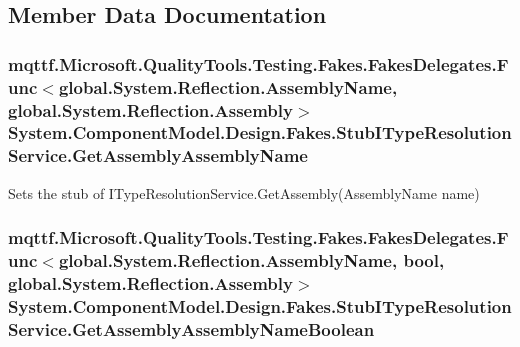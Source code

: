 \subsection{Member Data Documentation}
\hypertarget{class_system_1_1_component_model_1_1_design_1_1_fakes_1_1_stub_i_type_resolution_service_af9f13884b7ffda6eea45ee12b26d40ce}{
\subsubsection[{Get\-Assembly\-Assembly\-Name}]{\setlength{\rightskip}{0pt plus 5cm}mqttf.\-Microsoft.\-Quality\-Tools.\-Testing.\-Fakes.\-Fakes\-Delegates.\-Func$<$global.\-System.\-Reflection.\-Assembly\-Name, global.\-System.\-Reflection.\-Assembly$>$ System.\-Component\-Model.\-Design.\-Fakes.\-Stub\-I\-Type\-Resolution\-Service.\-Get\-Assembly\-Assembly\-Name}}\label{class_system_1_1_component_model_1_1_design_1_1_fakes_1_1_stub_i_type_resolution_service_af9f13884b7ffda6eea45ee12b26d40ce}


Sets the stub of I\-Type\-Resolution\-Service.\-Get\-Assembly(\-Assembly\-Name name)

\hypertarget{class_system_1_1_component_model_1_1_design_1_1_fakes_1_1_stub_i_type_resolution_service_ab5c3d30a68e45b39324047c217536da9}{
\subsubsection[{Get\-Assembly\-Assembly\-Name\-Boolean}]{\setlength{\rightskip}{0pt plus 5cm}mqttf.\-Microsoft.\-Quality\-Tools.\-Testing.\-Fakes.\-Fakes\-Delegates.\-Func$<$global.\-System.\-Reflection.\-Assembly\-Name, bool, global.\-System.\-Reflection.\-Assembly$>$ System.\-Component\-Model.\-Design.\-Fakes.\-Stub\-I\-Type\-Resolution\-Service.\-Get\-Assembly\-Assembly\-Name\-Boolean}}\label{class_system_1_1_component_model_1_1_design_1_1_fakes_1_1_stub_i_type_resolution_service_ab5c3d30a68e45b39324047c217536da9}


